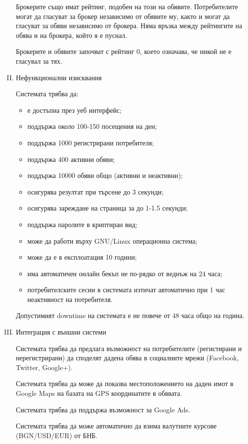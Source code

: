 \documentclass[]{article}
\begin{document}
\begin{enumerate}[I.]
{Брокерите също имат рейтинг, подобен на този на обявите. Потребителите могат да гласуват за брокер независимо от обявите му, както и могат да гласуват за обяви независимо от брокера. Няма връзка между рейтингите на обява и на брокера, който я е пуснал. 

Брокерите и обявите започват с рейтинг 0, което означава, че никой не е гласувал за тях. 


} %

\item {Нефункционални изисквания
	
Системата трябва да:
	\begin{itemize}
	\item е достъпна през уеб интерфейс;
	\item поддържа около 100-150 посещения на ден;
	\item поддържа 1000 регистрирани потребителя;
	\item поддържа 400 активни обяви;
	\item поддържа 10000 обяви общо (активни и неактивни);
	\item осигурява резултат при търсене до 3 секунди;
	\item осигурява зареждане на страница за до 1-1.5 секунди;
	\item поддържа паролите в криптиран вид;
	\item може да работи върху GNU/Linux операционна система;
	\item може да е в експлоатация 10 години;
	\item има автоматичен онлайн бекъп не по-рядко от веднъж на 24 часа;
	\item потребителските сесии в системата изтичат автоматично при 1 час неактивност на потребителя.
	\end{itemize}
		
Допустимият downtime на системата е не повече от 48 часа общо на година.
} %

\item {Интеграция с външни системи

Системата трябва да предлага възможност на потребителите (регистирани и нерегистрирани) да споделят дадена обява в социалните мрежи (Facebook, Twitter, Google+).

Системата трябва да може да показва местоположението на даден имот в Google Maps на базата на GPS координатите в обявата.

Системата трябва да поддържа възможност за Google Ads.

Системата трябва да може автоматично да взима валутните курсове (BGN/USD/EUR) от БНБ.	
} %

\end{enumerate}
\end{document}
